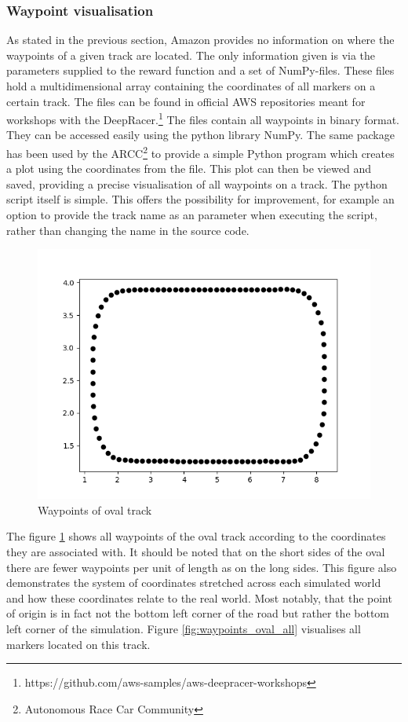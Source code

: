 \subsubsection{Waypoint visualisation}
As stated in the previous section, Amazon provides no information on where the waypoints of a given track are located. The only information given is via the parameters supplied to the reward function and a set of NumPy-files. These files hold a multidimensional array containing the coordinates of all markers on a certain track. The files can be found in official AWS repositories meant for workshops with the DeepRacer.\footnote{https://github.com/aws-samples/aws-deepracer-workshops} The files contain all waypoints in binary format. They can be accessed easily using the python library NumPy.
The same package has been used by the ARCC\footnote{Autonomous Race Car Community} to provide a simple Python program which creates a plot using the coordinates from the file. This plot can then be viewed and saved, providing a precise visualisation of all waypoints on a track. The python script itself is simple. This offers the possibility for improvement, for example an option to provide the track name as an parameter when executing the script, rather than changing the name in the source code.

\begin{figure}
    \centering
    \includegraphics[width=.85\textwidth]{images/oval_track_waypoints2.png}
    \caption{Waypoints of oval track}
    \label{fig:waypoints_oval}
\end{figure}

The figure \ref{fig:waypoints_oval} shows all waypoints of the oval track according to the coordinates they are associated with. It should be noted that on the short sides of the oval there are fewer waypoints per unit of length as on the long sides. This figure also demonstrates the system of coordinates stretched across each simulated world and how these coordinates relate to the real world. Most notably, that the point of origin is in fact not the bottom left corner of the road but rather the bottom left corner of the simulation. Figure \ref{fig:waypoints_oval_all} visualises all markers located on this track.

